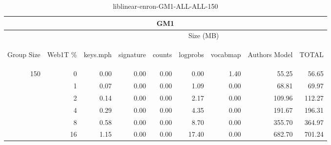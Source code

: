 \begin{center}
\begin{table}[htbp] 
 \begin{center}
\begin{tabular}{ | r | r | r | r | r | r | r | r | r |}
\hline
\multicolumn{9}{|c|}{GM1}\\
\hline
 & & \multicolumn{7}{|c|}{Size (MB)}\\ \cline{3-9}
\begin{sideways}Group Size\end{sideways} & \begin{sideways}Web1T \% \end{sideways} & \begin{sideways}keys.mph\end{sideways} & \begin{sideways}signature\end{sideways} & \begin{sideways}counts\end{sideways} & \begin{sideways}logprobs\end{sideways} & \begin{sideways}vocabmap\end{sideways} & \begin{sideways}Authors Model \end{sideways} & \begin{sideways}TOTAL\end{sideways}\\
\hline
\multirow{5}{*}{150}
 & 0 & 0.00 & 0.00 & 0.00 & 0.00 & 1.40 & 55.25 & 56.65\\ \cline{2-9}
 & 1 & 0.07 & 0.00 & 0.00 & 1.09 & 0.00 & 68.81 & 69.97\\ \cline{2-9}
 & 2 & 0.14 & 0.00 & 0.00 & 2.17 & 0.00 & 109.96 & 112.27\\ \cline{2-9}
 & 4 & 0.29 & 0.00 & 0.00 & 4.35 & 0.00 & 191.67 & 196.31\\ \cline{2-9}
 & 8 & 0.58 & 0.00 & 0.00 & 8.70 & 0.00 & 355.70 & 364.97\\ \cline{2-9}
 & 16 & 1.15 & 0.00 & 0.00 & 17.40 & 0.00 & 682.70 & 701.24\\ \cline{2-9}
\hline
\end{tabular}
\caption{liblinear-enron-GM1-ALL-ALL-150}
\label{table:liblinear-enron-GM1-ALL-ALL-150}
\end{center}
 \end{table}
\end{center}

